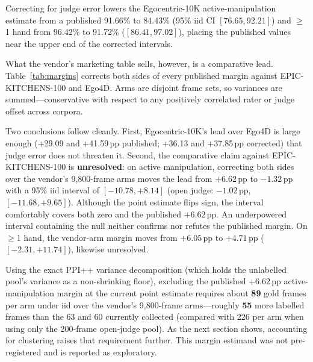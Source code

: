 \documentclass[11pt]{article}
\begin{document}
Correcting for judge error lowers the Egocentric-10K active-manipulation estimate from a published
91.66\% to 84.43\% (95\% iid CI $[76.65, 92.21]$) and $\geq$1 hand from 96.42\% to 91.72\%
($[86.41, 97.02]$), placing the published values near the upper end of the corrected intervals.

What the vendor's marketing table sells, however, is a comparative lead. Table~\ref{tab:margins}
corrects both sides of every published margin against EPIC-KITCHENS-100 and Ego4D. Arms are
disjoint frame sets, so variances are summed---conservative with respect to any positively
correlated rater or judge offset across corpora.

\begin{table}[t]
\centering\footnotesize

\caption{Published margins (Egocentric-10K minus comparator, in percentage points) against
gold-corrected PPI++ margins for both the vendor full arm ($N=9{,}800$) and the open-judge pool
($N\approx 140$). ``$n$/arm'' is the iid gold sample size per arm needed to exclude the published
margin at 95\% confidence holding the point estimate fixed; ``floor'' marks comparisons where
the 200-frame unlabelled pool variance alone exceeds the target.}
\label{tab:margins}
\end{table}

Two conclusions follow cleanly. First, Egocentric-10K's lead over Ego4D is large enough (+29.09
and +41.59\,pp published; +36.13 and +37.85\,pp corrected) that judge error does not threaten it.
Second, the comparative claim against EPIC-KITCHENS-100 is \textbf{unresolved}: on active
manipulation, correcting both sides over the vendor's 9{,}800-frame arms moves the lead from
$+6.62$\,pp to $-1.32$\,pp with a 95\% iid interval of $[-10.78, +8.14]$ (open judge: $-1.02$\,pp,
$[-11.68, +9.65]$). Although the point estimate flips sign, the interval comfortably covers both
zero and the published $+6.62$\,pp. An underpowered interval containing the null neither confirms
nor refutes the published margin. On $\geq$1 hand, the vendor-arm margin moves from $+6.05$\,pp to
$+4.71$\,pp ($[-2.31, +11.74]$), likewise unresolved.

Using the exact PPI++ variance decomposition (which holds the unlabelled pool's variance as a
non-shrinking floor), excluding the published $+6.62$\,pp active-manipulation margin at the
current point estimate requires about \textbf{89} gold frames per arm under iid over the vendor's
9{,}800-frame arms---roughly \textbf{55} more labelled frames than the 63 and 60 currently
collected (compared with 226 per arm when using only the 200-frame open-judge pool). As the next
section shows, accounting for clustering raises that requirement further. This margin estimand was
not pre-registered and is reported as exploratory.
\end{document}
